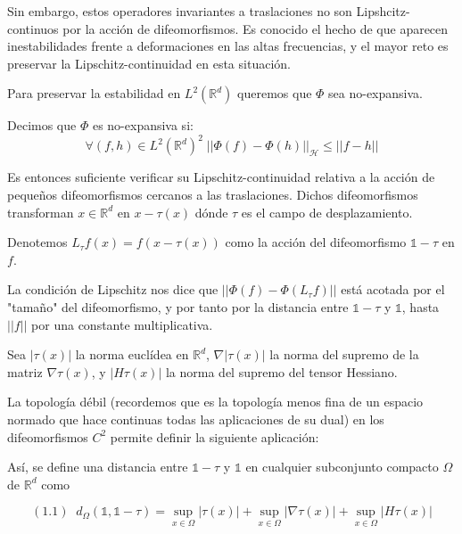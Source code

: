\medskip

\noindent Sin embargo, estos operadores invariantes a traslaciones no son Lipshcitz-continuos por la acción de difeomorfismos. Es conocido el hecho de que aparecen inestabilidades frente a deformaciones en las altas frecuencias, y el mayor reto es preservar la Lipschitz-continuidad en esta situación.

\medskip

\noindent Para preservar la estabilidad en $L^2(\mathbb{R}^d)$ queremos que $\Phi$ sea no-expansiva. 

\begin{definicion}
Decimos que $\Phi$ es no-expansiva si: 
$$\forall (f,h) \in L^2(\mathbb{R}^d)^2 \; || \Phi(f)-\Phi(h)||_\mathcal{H} \leq ||f-h||$$
\end{definicion}

\noindent Es entonces suficiente verificar su Lipschitz-continuidad relativa a la acción de pequeños difeomorfismos cercanos a las traslaciones. Dichos difeomorfismos transforman $x \in \mathbb{R}^d$ en $x-\tau (x)$ dónde $\tau$ es el campo de desplazamiento. 

\begin{definicion}
Denotemos $L_{\tau} f(x)=f(x-\tau(x))$ como la acción del difeomorfismo $\mathbb{1}-\tau$ en $f$.
\end{definicion} 

\medskip

\noindent La condición de Lipschitz nos dice que $||\Phi(f)-\Phi(L_\tau f)||$ está acotada por el "tamaño" del difeomorfismo, y por tanto por la distancia entre $\mathbb{1}-\tau$ y $\mathbb{1}$, hasta $||f||$ por una constante multiplicativa. 

\medskip

\noindent Sea $|\tau (x)|$ la norma euclídea en $\mathbb{R}^d$, $\nabla |\tau (x)|$ la norma del supremo de la matriz $\nabla \tau (x)$, y $|H \tau (x)|$ la norma del supremo del tensor Hessiano.  

La topología débil (recordemos que es la topología menos fina de un espacio normado que hace continuas todas las aplicaciones de su dual) en los difeomorfismos $C^2$  permite definir la siguiente aplicación: 
\begin{definicion}
Así, se define una distancia entre $\mathbb{1}-\tau$ y $\mathbb{1}$ en cualquier subconjunto compacto $\Omega$ de $\mathbb{R}^d$ como 

$$(1.1) \; \; d_\Omega(\mathbb{1},\mathbb{1}-\tau) = \sup_{x \in \Omega} |\tau (x)| + \sup_{x \in \Omega} |\nabla \tau (x)| + \sup_{x \in \Omega}|H \tau (x)|  $$
\end{definicion}
\medskip

